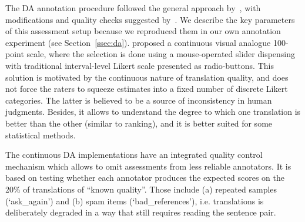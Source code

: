 The DA annotation procedure followed the general approach by~\citet{Graham2013}, with modifications and quality checks suggested by~\citet{Guzman2019}. 
We describe the key parameters of this assessment setup because we reproduced them in our own annotation experiment (see Section~\ref{ssec:da}). 
\citet{Graham2013} proposed a continuous visual analogue 100-point scale, where the selection is done using a mouse-operated slider dispensing with traditional interval-level Likert scale presented as radio-buttons. 
This solution is motivated by the continuous nature of translation quality, and does not force the raters to squeeze estimates into a fixed number of discrete Likert categories. The latter is believed to be a source of inconsistency in human judgments. 
Besides, it allows to understand the degree to which one translation is better than the other (similar to ranking), and it is better suited for some statistical methods. 

The continuous DA implementations have an integrated quality control mechanism which allows to omit assessments from less reliable annotators. It is based on testing whether each annotator produces the expected scores on the 20\% of translations of ``known quality''. Those include (a) repeated samples (`ask\_again') and (b) spam items (`bad\_references'), i.e. translations is deliberately degraded in a way that still requires reading the sentence pair. 

